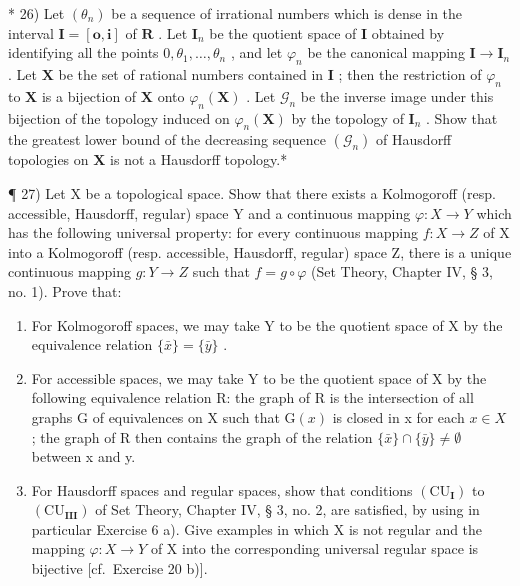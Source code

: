 * 26) Let \((\theta_{n})\) be a sequence of irrational numbers which is dense in the interval \(\mathbf{I} = [\mathbf{o},\mathbf{i}]\) of \(\mathbf{R}\) . Let \(\mathbf{I}_n\) be the quotient space of \(\mathbf{I}\) obtained by identifying all the points \(0, \theta_1, \ldots, \theta_n\) , and let \(\varphi_n\) be the canonical mapping \(\mathbf{I} \to \mathbf{I}_n\) . Let \(\mathbf{X}\) be the set of rational numbers contained in \(\mathbf{I}\) ; then the restriction of \(\varphi_n\) to \(\mathbf{X}\) is a bijection of \(\mathbf{X}\) onto \(\varphi_n(\mathbf{X})\) . Let \(\mathcal{G}_n\) be the inverse image under this bijection of the topology induced on \(\varphi_n(\mathbf{X})\) by the topology of \(\mathbf{I}_n\) . Show that the greatest lower bound of the decreasing sequence \((\mathcal{G}_n)\) of Hausdorff topologies on \(\mathbf{X}\) is not a Hausdorff topology.*

¶ 27) Let X be a topological space. Show that there exists a Kolmogoroff (resp. accessible, Hausdorff, regular) space Y and a continuous mapping \(\varphi: X \to Y\) which has the following universal property: for every continuous mapping \(f: X \to Z\) of X into a Kolmogoroff (resp. accessible, Hausdorff, regular) space Z, there is a unique continuous mapping \(g: Y \to Z\) such that \(f = g \circ \varphi\) (Set Theory, Chapter IV, § 3, no. 1). Prove that:

\begin{enumerate}
\def\labelenumi{\alph{enumi})}
\item
  For Kolmogoroff spaces, we may take Y to be the quotient space of X by the equivalence relation \(\{\bar{x}\}=\{\bar{y}\}\) .
\item
  For accessible spaces, we may take Y to be the quotient space of X by the following equivalence relation R: the graph of R is the intersection of all graphs G of equivalences on X such that \(\mathrm{G}(x)\) is closed in x for each \(x \in X\) ; the graph of R then contains the graph of the relation \(\{\bar{x}\} \cap \{\bar{y}\} \neq \emptyset\) between x and y.
\item
  For Hausdorff spaces and regular spaces, show that conditions \((\mathrm{CU}_{\mathbf{I}})\) to \((\mathrm{CU}_{\mathbf{III}})\) of Set Theory, Chapter IV, § 3, no. 2, are satisfied, by using in particular Exercise 6 a). Give examples in which X is not regular and the mapping \(\varphi: X \to Y\) of X into the corresponding universal regular space is bijective {[}cf.~Exercise 20 b){]}.
\end{enumerate}

